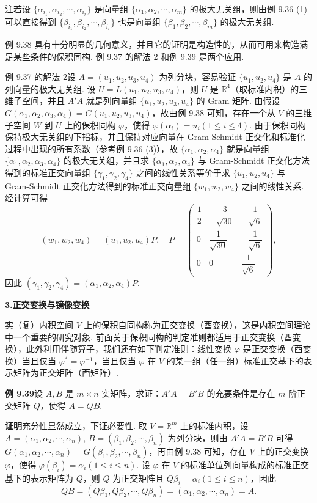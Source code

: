 \documentclass[UTF8,12pt,a4paper,fontset=fandol]{ctexart}
\begin{document}
注\quad 若设 $\{\alpha_{i_1},\alpha_{i_2},\cdots,\alpha_{i_r}\}$ 是向量组 $\{\alpha_1,\alpha_2,\cdots,\alpha_m\}$ 的极大无关组，则由例 9.36 (1) 可以直接得到 $\{\beta_{i_1},\beta_{i_2},\cdots,\beta_{i_r}\}$ 也是向量组 $\{\beta_1,\beta_2,\cdots,\beta_m\}$ 的极大无关组.

例 9.38 具有十分明显的几何意义，并且它的证明是构造性的，从而可用来构造满足某些条件的保积同构. 例 9.37 的解法 2 和例 9.39 是两个应用.

例 9.37 的解法 2\quad 设 $A=(u_1,u_2,u_3,u_4)$ 为列分块，容易验证 $\{u_1,u_2,u_4\}$ 是 $A$ 的列向量的极大无关组. 设 $U=L(u_1,u_2,u_3,u_4)$，则 $U$ 是 $\mathbb{R}^4$（取标准内积）的三维子空间，并且 $A'A$ 就是列向量组 $\{u_1,u_2,u_3,u_4\}$ 的 Gram 矩阵. 由假设 $G(\alpha_1,\alpha_2,\alpha_3,\alpha_4)=G(u_1,u_2,u_3,u_4)$，故由例 9.38 可知，存在一个从 $V$ 的三维子空间 $W$ 到 $U$ 上的保积同构 $\varphi$，使得 $\varphi(\alpha_i)=u_i(1\le i\le 4)$. 由于保积同构保持极大无关组的下指标，并且保持对应向量在 Gram-Schmidt 正交化和标准化过程中出现的所有系数（参考例 9.36 (3)），故 $\{\alpha_1,\alpha_2,\alpha_4\}$ 就是向量组 $\{\alpha_1,\alpha_2,\alpha_3,\alpha_4\}$ 的极大无关组，并且求 $\{\alpha_1,\alpha_2,\alpha_4\}$ 与 Gram-Schmidt 正交化方法得到的标准正交向量组 $\{\gamma_1,\gamma_2,\gamma_4\}$ 之间的线性关系等价于求 $\{u_1,u_2,u_4\}$ 与 Gram-Schmidt 正交化方法得到的标准正交向量组 $\{w_1,w_2,w_4\}$ 之间的线性关系. 经计算可得
\[
(w_1,w_2,w_4)=(u_1,u_2,u_4)P,\quad
P=
\begin{pmatrix}
\dfrac12&-\dfrac3{\sqrt{30}}&-\dfrac1{\sqrt6}\\
0&\dfrac1{\sqrt{30}}&-\dfrac1{\sqrt6}\\
0&0&\dfrac1{\sqrt6}
\end{pmatrix},
\]
因此 $(\gamma_1,\gamma_2,\gamma_4)=(\alpha_1,\alpha_2,\alpha_4)P$.

\noindent\textbf{3.\quad 正交变换与镜像变换}

实（复）内积空间 $V$ 上的保积自同构称为正交变换（酉变换），这是内积空间理论中一个重要的研究对象. 前面关于保积同构的判定准则都适用于正交变换（酉变换），此外利用伴随算子，我们还有如下判定准则：线性变换 $\varphi$ 是正交变换（酉变换）当且仅当 $\varphi^*=\varphi^{-1}$，当且仅当 $\varphi$ 在 $V$ 的某一组（任一组）标准正交基下的表示矩阵为正交矩阵（酉矩阵）.

\noindent\textbf{例 9.39}\quad 设 $A,B$ 是 $m\times n$ 实矩阵，求证：$A'A=B'B$ 的充要条件是存在 $m$ 阶正交矩阵 $Q$，使得 $A=QB$.

\noindent\textbf{证明}\quad 充分性显然成立，下证必要性. 取 $V=\mathbb{R}^m$ 上的标准内积，设 $A=(\alpha_1,\alpha_2,\cdots,\alpha_n)$, $B=(\beta_1,\beta_2,\cdots,\beta_n)$ 为列分块，则由 $A'A=B'B$ 可得 $G(\alpha_1,\alpha_2,\cdots,\alpha_n)=G(\beta_1,\beta_2,\cdots,\beta_n)$，再由例 9.38 可知，存在 $V$ 上的正交变换 $\varphi$，使得 $\varphi(\beta_i)=\alpha_i(1\le i\le n)$. 设 $\varphi$ 在 $V$ 的标准单位列向量构成的标准正交基下的表示矩阵为 $Q$，则 $Q$ 为正交矩阵且 $Q\beta_i=\alpha_i(1\le i\le n)$，因此
\[
QB=(Q\beta_1,Q\beta_2,\cdots,Q\beta_n)=(\alpha_1,\alpha_2,\cdots,\alpha_n)=A.
\]
\end{document}
